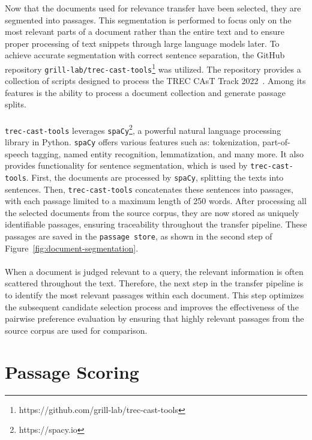 Now that the documents used for relevance transfer have been selected, they are segmented into passages. This segmentation is performed to focus only on the most relevant parts of a document rather than the entire text and to ensure proper processing of text snippets through large language models later. To achieve accurate segmentation with correct sentence separation, the GitHub repository \texttt{grill-lab/trec-cast-tools}\footnote{\scriptsize https://github.com/grill-lab/trec-cast-tools} was utilized. The repository provides a collection of scripts designed to process the TREC CAsT Track 2022~\cite{owoicho:2022}. Among its features is the ability to process a document collection and generate passage splits.
\\\\
\texttt{trec-cast-tools} leverages \texttt{spaCy}\footnote{\scriptsize https://spacy.io}, a powerful natural language processing library in Python. \texttt{spaCy} offers various features such as: tokenization, part-of-speech tagging, named entity recognition, lemmatization, and many more. It also provides functionality for sentence segmentation, which is used by \texttt{trec-cast-tools}. First, the documents are processed by \texttt{spaCy}, splitting the texts into sentences. Then, \texttt{trec-cast-tools} concatenates these sentences into passages, with each passage limited to a maximum length of 250 words. After processing all the selected documents from the source corpus, they are now stored as uniquely identifiable passages, ensuring traceability throughout the transfer pipeline. These passages are saved in the \texttt{passage store}, as shown in the second step of Figure~\ref{fig:document-segmentation}.
\\\\
When a document is judged relevant to a query, the relevant information is often scattered throughout the text. Therefore, the next step in the transfer pipeline is to identify the most relevant passages within each document. This step optimizes the subsequent candidate selection process and improves the effectiveness of the pairwise preference evaluation by ensuring that highly relevant passages from the source corpus are used for comparison.
\pagebreak


\section{Passage Scoring}\label{passage-scoring}

